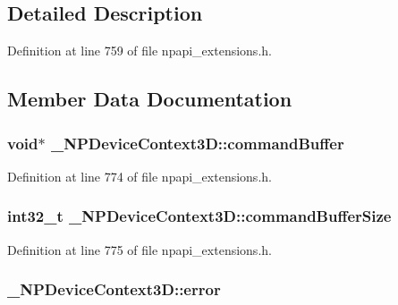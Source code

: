 \subsection{Detailed Description}


Definition at line 759 of file npapi\_\-extensions.h.



\subsection{Member Data Documentation}
\hypertarget{struct___n_p_device_context3_d_a92feeedd3fa2e4f14a9a0883e0883869}{
\subsubsection[{commandBuffer}]{\setlength{\rightskip}{0pt plus 5cm}void$\ast$ {\bf \_\-NPDeviceContext3D::commandBuffer}}}
\label{struct___n_p_device_context3_d_a92feeedd3fa2e4f14a9a0883e0883869}


Definition at line 774 of file npapi\_\-extensions.h.

\hypertarget{struct___n_p_device_context3_d_af3d1a17e3a16355d530a2960d5167c7d}{
\subsubsection[{commandBufferSize}]{\setlength{\rightskip}{0pt plus 5cm}int32\_\-t {\bf \_\-NPDeviceContext3D::commandBufferSize}}}
\label{struct___n_p_device_context3_d_af3d1a17e3a16355d530a2960d5167c7d}


Definition at line 775 of file npapi\_\-extensions.h.

\hypertarget{struct___n_p_device_context3_d_a441e48d904459693f94a49f56ac9e419}{
\subsubsection[{error}]{ {\bf \_\-NPDeviceContext3D::error}}}
\label{struct___n_p_device_context3_d_a441e48d904459693f94a49f56ac9e419}


